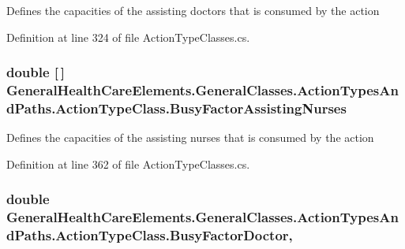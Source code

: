Defines the capacities of the assisting doctors that is consumed by the action 



Definition at line 324 of file Action\+Type\+Classes.\+cs.

\subsubsection[{\texorpdfstring{Busy\+Factor\+Assisting\+Nurses}{BusyFactorAssistingNurses}}]{\setlength{\rightskip}{0pt plus 5cm}double \mbox{[}$\,$\mbox{]} General\+Health\+Care\+Elements.\+General\+Classes.\+Action\+Types\+And\+Paths.\+Action\+Type\+Class.\+Busy\+Factor\+Assisting\+Nurses\hspace{0.3cm}{\ttfamily [get]}}\hypertarget{class_general_health_care_elements_1_1_general_classes_1_1_action_types_and_paths_1_1_action_type_class_ac9f50c2c1becb75fe905f1957c47b264}{}\label{class_general_health_care_elements_1_1_general_classes_1_1_action_types_and_paths_1_1_action_type_class_ac9f50c2c1becb75fe905f1957c47b264}


Defines the capacities of the assisting nurses that is consumed by the action 



Definition at line 362 of file Action\+Type\+Classes.\+cs.

\subsubsection[{\texorpdfstring{Busy\+Factor\+Doctor}{BusyFactorDoctor}}]{\setlength{\rightskip}{0pt plus 5cm}double General\+Health\+Care\+Elements.\+General\+Classes.\+Action\+Types\+And\+Paths.\+Action\+Type\+Class.\+Busy\+Factor\+Doctor\hspace{0.3cm}{\ttfamily [get]}, {\ttfamily [set]}}\hypertarget{class_general_health_care_elements_1_1_general_classes_1_1_action_types_and_paths_1_1_action_type_class_a9956b8f439b37d7c5d7526698fae50dc}{}\label{class_general_health_care_elements_1_1_general_classes_1_1_action_types_and_paths_1_1_action_type_class_a9956b8f439b37d7c5d7526698fae50dc}


